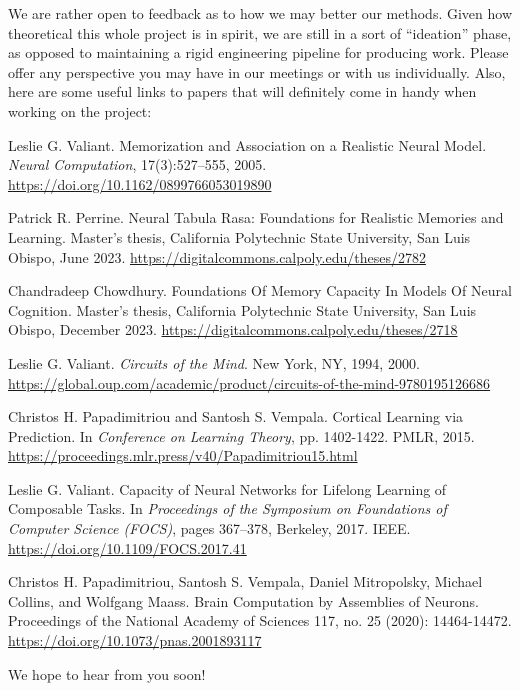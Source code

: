 \documentclass{article}
\begin{document}
\noindent We are rather open to feedback as to how we may better our methods. Given how theoretical this whole project is in spirit, we are still in a sort of ``ideation'' phase, as opposed to maintaining a rigid engineering pipeline for producing work. Please offer any perspective you may have in our meetings or with us individually. Also, here are some useful links to papers that will definitely come in handy when working on the project: \\

\vspace{4mm}

\renewcommand{\section}[2]{}

\begin{thebibliography}{1}
Leslie G. Valiant. Memorization and Association on a Realistic Neural Model. \textit{Neural Computation}, 17(3):527–555, 2005. \url{https://doi.org/10.1162/0899766053019890}
\end{thebibliography}

\vspace{4mm}

\begin{thebibliography}{9}
\makeatletter
\addtocounter{\@listctr}{1}
\makeatother

Patrick R. Perrine. Neural Tabula Rasa: Foundations for Realistic Memories and Learning. Master’s thesis, California Polytechnic State University, San Luis Obispo, June 2023. \url{https://digitalcommons.calpoly.edu/theses/2782}

Chandradeep Chowdhury. Foundations Of Memory Capacity In Models Of Neural Cognition. Master’s thesis, California Polytechnic State University, San Luis Obispo, December 2023. \url{https://digitalcommons.calpoly.edu/theses/2718}

Leslie G. Valiant. \textit{Circuits of the Mind}. New York, NY, 1994, 2000. \url{https://global.oup.com/academic/product/circuits-of-the-mind-9780195126686}

Christos H. Papadimitriou and Santosh S. Vempala. Cortical Learning via Prediction. In \textit{Conference on Learning Theory}, pp. 1402-1422. PMLR, 2015. \url{https://proceedings.mlr.press/v40/Papadimitriou15.html}

Leslie G. Valiant. Capacity of Neural Networks for Lifelong Learning of Composable Tasks. In \textit{Proceedings of the Symposium on Foundations of Computer Science (FOCS)}, pages 367–378, Berkeley, 2017. IEEE. \url{https://doi.org/10.1109/FOCS.2017.41}

Christos H. Papadimitriou, Santosh S. Vempala, Daniel Mitropolsky, Michael Collins, and Wolfgang Maass. Brain Computation by Assemblies of Neurons. Proceedings of the National Academy of Sciences 117, no. 25 (2020): 14464-14472. \url{https://doi.org/10.1073/pnas.2001893117}
\end{thebibliography} 

\vspace{1.5cm}
\begin{center}
{\Large{We hope to hear from you soon!}}
\end{center}
\end{document}
